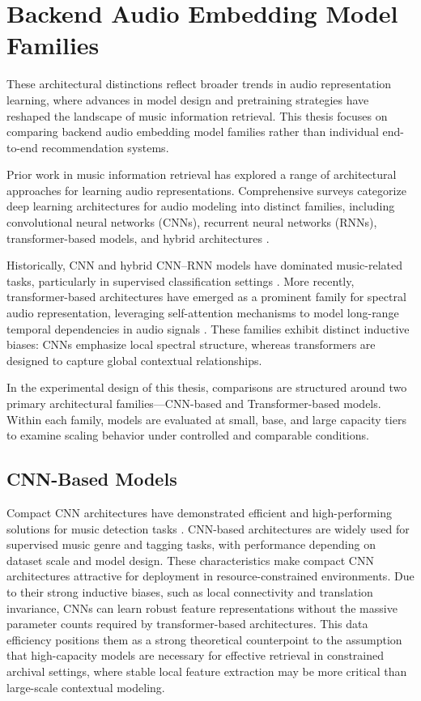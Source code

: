 \section{Backend Audio Embedding Model Families}

These architectural distinctions reflect broader trends in audio representation learning, where advances in model design and pretraining strategies have reshaped the landscape of music information retrieval. 
This thesis focuses on comparing backend audio embedding model families rather than individual end-to-end recommendation systems. 

Prior work in music information retrieval has explored a range of architectural approaches for learning audio representations. 
Comprehensive surveys categorize deep learning architectures for audio modeling into distinct families, including convolutional neural networks (CNNs), recurrent neural networks (RNNs), transformer-based models, and hybrid architectures \cite{zaman2023}. 

Historically, CNN and hybrid CNN–RNN models have dominated music-related tasks, particularly in supervised classification settings \cite{jiang2024}. 
More recently, transformer-based architectures have emerged as a prominent family for spectral audio representation, leveraging self-attention mechanisms to model long-range temporal dependencies in audio signals \cite{zaman2023}. 
These families exhibit distinct inductive biases: CNNs emphasize local spectral structure, whereas transformers are designed to capture global contextual relationships.

In the experimental design of this thesis, comparisons are structured around two primary architectural families—CNN-based and Transformer-based models. 
Within each family, models are evaluated at small, base, and large capacity tiers to examine scaling behavior under controlled and comparable conditions.


\subsection{CNN-Based Models}
Compact CNN architectures have demonstrated efficient and high-performing solutions for music detection tasks \cite{reddy2022}.
CNN-based architectures are widely used for supervised music genre and tagging tasks, with performance depending on dataset scale and model design.
These characteristics make compact CNN architectures attractive for deployment in resource-constrained environments.
Due to their strong inductive biases, such as local connectivity and translation invariance, CNNs can learn robust feature representations without the massive parameter counts required by transformer-based architectures. 
This data efficiency positions them as a strong theoretical counterpoint to the assumption that high-capacity models are necessary for effective retrieval in constrained archival settings, where stable local feature extraction may be more critical than large-scale contextual modeling.

